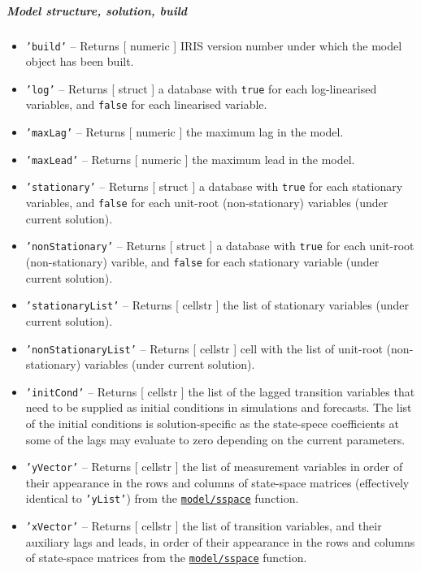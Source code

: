 \subparagraph{Model structure, solution,
build}

\begin{itemize}
\item
  \texttt{'build'} -- Returns {[} numeric {]} IRIS version number under
  which the model object has been built.
\item
  \texttt{'log'} -- Returns {[} struct {]} a database with \texttt{true}
  for each log-linearised variables, and \texttt{false} for each
  linearised variable.
\item
  \texttt{'maxLag'} -- Returns {[} numeric {]} the maximum lag in the
  model.
\item
  \texttt{'maxLead'} -- Returns {[} numeric {]} the maximum lead in the
  model.
\item
  \texttt{'stationary'} -- Returns {[} struct {]} a database with
  \texttt{true} for each stationary variables, and \texttt{false} for
  each unit-root (non-stationary) variables (under current solution).
\item
  \texttt{'nonStationary'} -- Returns {[} struct {]} a database with
  \texttt{true} for each unit-root (non-stationary) varible, and
  \texttt{false} for each stationary variable (under current solution).
\item
  \texttt{'stationaryList'} -- Returns {[} cellstr {]} the list of
  stationary variables (under current solution).
\item
  \texttt{'nonStationaryList'} -- Returns {[} cellstr {]} cell with the
  list of unit-root (non-stationary) variables (under current solution).
\item
  \texttt{'initCond'} -- Returns {[} cellstr {]} the list of the lagged
  transition variables that need to be supplied as initial conditions in
  simulations and forecasts. The list of the initial conditions is
  solution-specific as the state-spece coefficients at some of the lags
  may evaluate to zero depending on the current parameters.
\item
  \texttt{'yVector'} -- Returns {[} cellstr {]} the list of measurement
  variables in order of their appearance in the rows and columns of
  state-space matrices (effectively identical to \texttt{'yList'}) from
  the \href{model/sspace}{\texttt{model/sspace}} function.
\item
  \texttt{'xVector'} -- Returns {[} cellstr {]} the list of transition
  variables, and their auxiliary lags and leads, in order of their
  appearance in the rows and columns of state-space matrices from the
  \href{model/sspace}{\texttt{model/sspace}} function.

\end{itemize}
